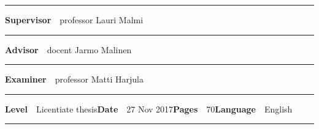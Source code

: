 \begin{spacing}{.88}
{\vspace{-2.4mm}\rule{\textwidth}{.75pt}

{\fontsize{10.5pt}{10.5pt}\bfseries\sffamily\lsstyle Supervisor}~~{\small professor Lauri Malmi}

\vspace{-2.4mm}\rule{\textwidth}{.75pt}

{\fontsize{10.5pt}{10.5pt}\bfseries\sffamily\lsstyle Advisor}~~{\small docent Jarmo Malinen}

\vspace{-2.4mm}\rule{\textwidth}{.75pt}

{\fontsize{10.5pt}{10.5pt}\bfseries\sffamily\lsstyle Examiner}~~{\small professor Matti Harjula}

\vspace{-2.4mm}\rule{\textwidth}{.75pt}

{\fontsize{10.5pt}{10.5pt}\bfseries\sffamily\lsstyle Level}~~{\small Licentiate thesis}\hfill{\fontsize{10.5pt}{10.5pt}\bfseries\sffamily\lsstyle Date}~~{\small 27 Nov 2017}\hfill{\fontsize{10.5pt}{10.5pt}\bfseries\sffamily\lsstyle Pages}~~{\small 70}\hfill{\fontsize{10.5pt}{10.5pt}\bfseries\sffamily\lsstyle Language}~~{\small English}

\vspace{-2.4mm}\rule{\textwidth}{.75pt}

\vspace{6mm}

} %
\end{spacing}
